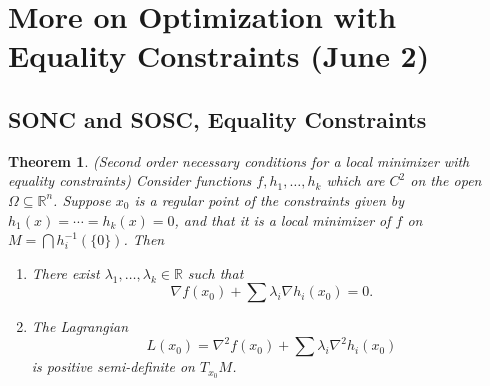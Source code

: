 \documentclass[11pt]{article}
\newcommand{\R}{\mathbb{R}}
\newtheorem{theorem}{Theorem}[subsection]
\begin{document}
\newpage

\section{More on Optimization with Equality Constraints (June 2)}

\subsection{SONC and SOSC, Equality Constraints}

\begin{theorem}
(Second order necessary conditions for a local minimizer with equality constraints) Consider functions $f, h_1, \dots, h_k$ which are $C^2$ on the open $\Omega \subseteq \R^n$. Suppose $x_0$ is a regular point of the constraints given by $h_1(x) = \cdots = h_k(x) = 0$, and that it is a local minimizer of $f$ on $M = \bigcap h_i^{-1}(\{0\})$. Then
\begin{enumerate}
\item
There exist $\lambda_1, \dots, \lambda_k \in \R$ such that
\[
\nabla f(x_0) + \sum \lambda_i \nabla h_i(x_0) = 0.
\]

\item
The Lagrangian
\[
L(x_0) = \nabla^2 f(x_0) + \sum \lambda_i \nabla^2 h_i(x_0)
\]
is positive semi-definite on $T_{x_0}M$.
\end{enumerate}
\end{theorem}
\end{document}
